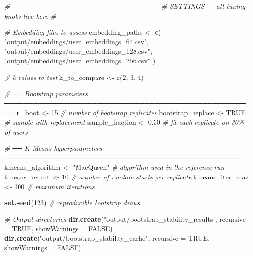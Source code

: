 \documentclass[
  11pt,
]{article}
\newenvironment{Shaded}{\begin{snugshade}}{\end{snugshade}}
\newcommand{\AttributeTok}[1]{\textcolor[rgb]{0.13,0.29,0.53}{#1}}
\newcommand{\CommentTok}[1]{\textcolor[rgb]{0.56,0.35,0.01}{\textit{#1}}}
\newcommand{\ConstantTok}[1]{\textcolor[rgb]{0.56,0.35,0.01}{#1}}
\newcommand{\DecValTok}[1]{\textcolor[rgb]{0.00,0.00,0.81}{#1}}
\newcommand{\FloatTok}[1]{\textcolor[rgb]{0.00,0.00,0.81}{#1}}
\newcommand{\FunctionTok}[1]{\textcolor[rgb]{0.13,0.29,0.53}{\textbf{#1}}}
\newcommand{\NormalTok}[1]{#1}
\newcommand{\OtherTok}[1]{\textcolor[rgb]{0.56,0.35,0.01}{#1}}
\newcommand{\StringTok}[1]{\textcolor[rgb]{0.31,0.60,0.02}{#1}}
\begin{document}
\begin{Shaded}
\begin{Highlighting}[]
\CommentTok{\# {-}{-}{-}{-}{-}{-}{-}{-}{-}{-}{-}{-}{-}{-}{-}{-}{-}{-}{-}{-}{-}{-}{-}{-}{-}{-}{-}{-}{-}{-}{-}{-}{-}{-}{-}{-}{-}{-}{-}{-}{-}{-}{-}{-}{-}{-}{-}{-}{-}{-}{-}{-}{-}{-}{-}{-}{-}{-}{-}{-}}
\CommentTok{\# SETTINGS — all tuning knobs live here}
\CommentTok{\# {-}{-}{-}{-}{-}{-}{-}{-}{-}{-}{-}{-}{-}{-}{-}{-}{-}{-}{-}{-}{-}{-}{-}{-}{-}{-}{-}{-}{-}{-}{-}{-}{-}{-}{-}{-}{-}{-}{-}{-}{-}{-}{-}{-}{-}{-}{-}{-}{-}{-}{-}{-}{-}{-}{-}{-}{-}{-}{-}{-}}

\CommentTok{\# Embedding files to assess}
\NormalTok{embedding\_paths }\OtherTok{\textless{}{-}} \FunctionTok{c}\NormalTok{(}
  \StringTok{"output/embeddings/user\_embeddings\_64.csv"}\NormalTok{,}
  \StringTok{"output/embeddings/user\_embeddings\_128.csv"}\NormalTok{,}
  \StringTok{"output/embeddings/user\_embeddings\_256.csv"}
\NormalTok{)}

\CommentTok{\# k values to test}
\NormalTok{k\_to\_compare }\OtherTok{\textless{}{-}} \FunctionTok{c}\NormalTok{(}\DecValTok{2}\NormalTok{, }\DecValTok{3}\NormalTok{, }\DecValTok{4}\NormalTok{)}

\CommentTok{\# ── Bootstrap parameters ────────────────────────────────────────────────────}
\NormalTok{n\_boot            }\OtherTok{\textless{}{-}} \DecValTok{15}    \CommentTok{\# number of bootstrap replicates}
\NormalTok{bootstrap\_replace }\OtherTok{\textless{}{-}} \ConstantTok{TRUE}  \CommentTok{\# sample with replacement}
\NormalTok{sample\_fraction   }\OtherTok{\textless{}{-}} \FloatTok{0.30}  \CommentTok{\# fit each replicate on 30\% of users}

\CommentTok{\# ── K{-}Means hyperparameters ─────────────────────────────────────────────────}
\NormalTok{kmeans\_algorithm  }\OtherTok{\textless{}{-}} \StringTok{"MacQueen"}  \CommentTok{\# algorithm used in the reference run}
\NormalTok{kmeans\_nstart     }\OtherTok{\textless{}{-}} \DecValTok{10}          \CommentTok{\# number of random starts per replicate}
\NormalTok{kmeans\_iter\_max   }\OtherTok{\textless{}{-}} \DecValTok{100}         \CommentTok{\# maximum iterations}

\FunctionTok{set.seed}\NormalTok{(}\DecValTok{123}\NormalTok{)  }\CommentTok{\# reproducible bootstrap draws}

\CommentTok{\# Output directories}
\FunctionTok{dir.create}\NormalTok{(}\StringTok{"output/bootstrap\_stability\_results"}\NormalTok{, }\AttributeTok{recursive =} \ConstantTok{TRUE}\NormalTok{, }\AttributeTok{showWarnings =} \ConstantTok{FALSE}\NormalTok{)}
\FunctionTok{dir.create}\NormalTok{(}\StringTok{"output/bootstrap\_stability\_cache"}\NormalTok{,   }\AttributeTok{recursive =} \ConstantTok{TRUE}\NormalTok{, }\AttributeTok{showWarnings =} \ConstantTok{FALSE}\NormalTok{)}
\end{Highlighting}
\end{Shaded}
\end{document}
